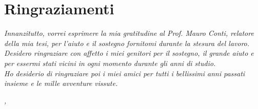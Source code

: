 \cleardoublepage
{}
\thispagestyle{empty}


\begingroup
\let\clearpage\relax
\let\cleardoublepage\relax
\let\cleardoublepage\relax

\section*{Ringraziamenti}

\noindent \textit{Innanzitutto, vorrei esprimere la mia gratitudine al Prof.
Mauro Conti, relatore della mia tesi, per l'aiuto e il sostegno fornitomi
durante la stesura del lavoro.}\\

\noindent \textit{Desidero ringraziare con affetto i miei genitori per il
sostegno, il grande aiuto e per essermi stati vicini in ogni momento durante
gli anni di studio.}\\

\noindent \textit{Ho desiderio di ringraziare poi i miei amici per tutti i
bellissimi anni passati insieme e le mille avventure vissute.}\\
\bigskip

\noindent\textit{\myLocation, \myTime}
\hfill \myName

\endgroup
